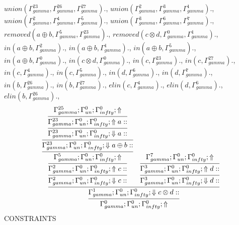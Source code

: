 \documentclass[a4paper, 11pt]{article}
\begin{document}
$union(\Gamma_{gamma}^{23}, \Gamma_{gamma}^{26}, \Gamma_{gamma}^{27}).$, $union(\Gamma_{gamma}^{2}, \Gamma_{gamma}^{3}, \Gamma_{gamma}^{1}).$, $union(\Gamma_{gamma}^{2}, \Gamma_{gamma}^{4}, \Gamma_{gamma}^{5}).$, $union(\Gamma_{gamma}^{3}, \Gamma_{gamma}^{6}, \Gamma_{gamma}^{7}).$, $removed(a \oplus b, \Gamma_{gamma}^{5}, \Gamma_{gamma}^{23}).$, $removed(c \otimes d, \Gamma_{gamma}^{0}, \Gamma_{gamma}^{1}).$, $in(a \oplus b, \Gamma_{gamma}^{2}).$, $in(a \oplus b, \Gamma_{gamma}^{1}).$, $in(a \oplus b, \Gamma_{gamma}^{5}).$, $in(a \oplus b, \Gamma_{gamma}^{0}).$, $in(c \otimes d, \Gamma_{gamma}^{0}).$, $in(c, \Gamma_{gamma}^{23}).$, $in(c, \Gamma_{gamma}^{27}).$, $in(c, \Gamma_{gamma}^{4}).$, $in(c, \Gamma_{gamma}^{5}).$, $in(d, \Gamma_{gamma}^{6}).$, $in(d, \Gamma_{gamma}^{7}).$, $in(b, \Gamma_{gamma}^{26}).$, $in(b, \Gamma_{gamma}^{27}).$, $elin(c, \Gamma_{gamma}^{4}).$, $elin(d, \Gamma_{gamma}^{6}).$, $elin(b, \Gamma_{gamma}^{26}).$, 
\[
\infer{\Gamma_{ gamma}^{0} ; \Gamma_{un}^{0} ; \Gamma_{ infty}^{0} ;  \Uparrow }
{\infer{\Gamma_{ gamma}^{1} ; \Gamma_{un}^{0} ; \Gamma_{ infty}^{0} ;  \Downarrow c \otimes d :: }
{\infer{\Gamma_{ gamma}^{2} ; \Gamma_{un}^{0} ; \Gamma_{ infty}^{0} ;  \Downarrow c :: }
{\infer{\Gamma_{ gamma}^{2} ; \Gamma_{un}^{0} ; \Gamma_{ infty}^{0} ;  \Uparrow c :: }
{\infer{\Gamma_{ gamma}^{5} ; \Gamma_{un}^{0} ; \Gamma_{ infty}^{0} ;  \Uparrow }
{\infer{\Gamma_{ gamma}^{23} ; \Gamma_{un}^{0} ; \Gamma_{ infty}^{0} ;  \Downarrow a \oplus b :: }
{\infer{\Gamma_{ gamma}^{23} ; \Gamma_{un}^{0} ; \Gamma_{ infty}^{0} ;  \Downarrow a :: }
{\infer{\Gamma_{ gamma}^{23} ; \Gamma_{un}^{0} ; \Gamma_{ infty}^{0} ;  \Uparrow a :: }
{\Gamma_{ gamma}^{25} ; \Gamma_{un}^{0} ; \Gamma_{ infty}^{0} ;  \Uparrow }}}}}}
&
\infer{\Gamma_{ gamma}^{3} ; \Gamma_{un}^{0} ; \Gamma_{ infty}^{0} ;  \Downarrow d :: }
{\infer{\Gamma_{ gamma}^{3} ; \Gamma_{un}^{0} ; \Gamma_{ infty}^{0} ;  \Uparrow d :: }
{\Gamma_{ gamma}^{7} ; \Gamma_{un}^{0} ; \Gamma_{ infty}^{0} ;  \Uparrow }}}}
\]
CONSTRAINTS
\end{document}
